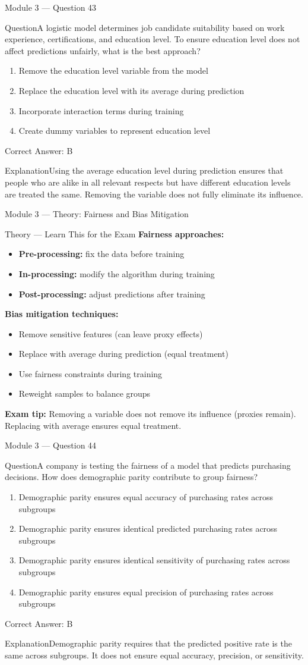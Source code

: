 \documentclass[aspectratio=169,10pt]{beamer}
\newcommand{\question}[1]{\begin{block}{Question}#1\end{block}}
\newcommand{\options}[4]{%
	\begin{enumerate}[label=\Alph*.,leftmargin=*]
		\item #1
		\item #2
		\item #3
		\item #4
	\end{enumerate}
}
\newcommand{\answerbox}[1]{\begin{exampleblock}{Correct Answer: #1}\end{exampleblock}}
\newcommand{\explain}[1]{\begin{block}{Explanation}#1\end{block}}
\newcommand{\theory}[1]{%
	\begin{block}{Theory --- Learn This for the Exam}
		\small #1
	\end{block}
}
\begin{document}
	\begin{frame}{Module 3 --- Question 43}
		\question{A logistic model determines job candidate suitability based on work experience, certifications, and education level. To ensure education level does not affect predictions unfairly, what is the best approach?}
		\options{Remove the education level variable from the model}{Replace the education level with its average during prediction}{Incorporate interaction terms during training}{Create dummy variables to represent education level}
		\answerbox{B}
		\explain{Using the average education level during prediction ensures that people who are alike in all relevant respects but have different education levels are treated the same. Removing the variable does not fully eliminate its influence.}
	\end{frame}
	
	\begin{frame}{Module 3 --- Theory: Fairness and Bias Mitigation}
		\theory{
			\textbf{Fairness approaches:}
			\begin{itemize}
				\item \textbf{Pre-processing:} fix the data before training
				\item \textbf{In-processing:} modify the algorithm during training
				\item \textbf{Post-processing:} adjust predictions after training
			\end{itemize}
			\textbf{Bias mitigation techniques:}
			\begin{itemize}
				\item Remove sensitive features (can leave proxy effects)
				\item Replace with average during prediction (equal treatment)
				\item Use fairness constraints during training
				\item Reweight samples to balance groups
			\end{itemize}
			\textbf{Exam tip:} Removing a variable does not remove its influence (proxies remain). Replacing with average ensures equal treatment.
		}
	\end{frame}
	
	\begin{frame}{Module 3 --- Question 44}
		\question{A company is testing the fairness of a model that predicts purchasing decisions. How does demographic parity contribute to group fairness?}
		\options{Demographic parity ensures equal accuracy of purchasing rates across subgroups}{Demographic parity ensures identical predicted purchasing rates across subgroups}{Demographic parity ensures identical sensitivity of purchasing rates across subgroups}{Demographic parity ensures equal precision of purchasing rates across subgroups}
		\answerbox{B}
		\explain{Demographic parity requires that the predicted positive rate is the same across subgroups. It does not ensure equal accuracy, precision, or sensitivity.}
	\end{frame}
	
\end{document}
